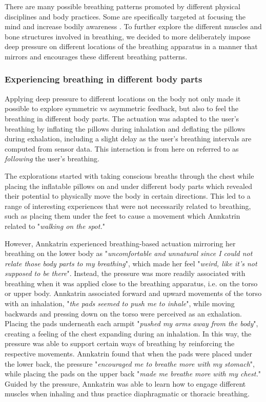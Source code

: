 There are many possible breathing patterns promoted by different physical disciplines and body practices. Some are specifically targeted at focusing the mind and increase bodily awareness \cite{kupershmidt_definition_2019, burke2008role}. To further explore the different muscles and bone structures involved in breathing, we decided to more deliberately impose deep pressure on different locations of the breathing apparatus in a manner that mirrors and encourages these different breathing patterns.  

\subsubsection{Experiencing breathing in different body parts}
Applying deep pressure to different locations on the body not only made it possible to explore symmetric vs asymmetric feedback, but also to feel the breathing in different body parts. The actuation was adapted to the user's breathing by inflating the pillows during inhalation and deflating the pillows during exhalation, including a slight delay as the user’s breathing intervals are computed from sensor data. This interaction is from here on referred to as \textit{following} the user's breathing.

The explorations started with taking conscious breaths through the chest while placing the inflatable pillows on and under different body parts which revealed their potential to physically move the body in certain directions. This led to a range of interesting experiences that were not necessarily related to breathing, such as placing them under the feet to cause a movement which Annkatrin related to "\textit{walking on the spot.}" 

However, Annkatrin experienced breathing-based actuation mirroring her breathing on the lower body as "\textit{uncomfortable and unnatural since I could not relate those body parts to my breathing}", which made her feel "\textit{weird, like it's not supposed to be there}". Instead, the pressure was more readily associated with breathing when it was applied close to the breathing apparatus, i.e. on the torso or upper body. Annkatrin associated forward and upward movements of the torso with an inhalation, "\textit{the pads seemed to push me to inhale}", while moving backwards and pressing down on the torso were perceived as an exhalation. Placing the pads underneath each armpit "\textit{pushed my arms away from the body}", creating a feeling of the chest expanding during an inhalation. In this way, the pressure was able to support certain ways of breathing by reinforcing the respective movements. Annkatrin found that when the pads were placed under the lower back, the pressure "\textit{encouraged me to breathe more with my stomach}", while placing the pads on the upper back "\textit{made me breathe more with my chest.}" Guided by the pressure, Annkatrin was able to learn how to engage different muscles when inhaling and thus practice diaphragmatic or thoracic breathing.

